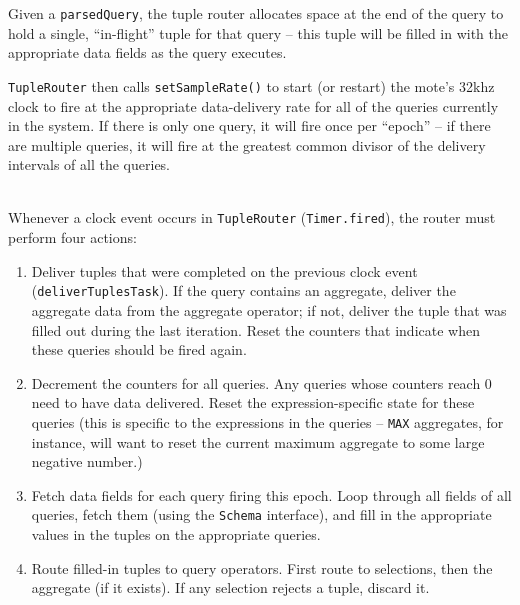 \documentclass[11pt]{article}
\begin{document}
Given a {\tt parsedQuery}, the tuple router allocates space at the end
  of the query to hold a single, ``in-flight'' tuple for that query --
  this tuple will be filled in with the appropriate data fields as the
  query executes.
  
{\tt TupleRouter} then calls {\tt setSampleRate()} to start (or restart) the
  mote's 32khz clock to fire at the appropriate data-delivery rate for
  all of the queries currently in the system.  If there is only one
  query, it will fire once per ``epoch'' -- if there are multiple queries,
  it will fire at the greatest common divisor of the delivery intervals of all the queries.

\vspace{1em}
\\
Whenever a clock event occurs in {\tt TupleRouter} ({\tt Timer.fired}), the
  router must perform four actions:
\begin{enumerate}

\item Deliver tuples that were completed on the previous clock event
  ({\tt deliverTuplesTask}).  If the query contains an aggregate,
  deliver the aggregate data from the aggregate operator;  if not,
  deliver the tuple that was filled out during the last
  iteration. Reset the counters that  indicate when these queries
  should be fired again.
  
\item Decrement the counters for all queries.  Any queries whose
  counters reach 0 need to have data delivered.  Reset the
  expression-specific state for these queries (this is specific
  to the expressions in the queries -- {\tt MAX} aggregates, for instance,
  will want to reset the current maximum aggregate to some large
  negative number.)

\item Fetch data fields for each query firing this epoch.  Loop
  through all fields of all queries, fetch them (using the {\tt Schema}
  interface), and fill in the appropriate values in the tuples
  on the appropriate queries.  
  
\item Route filled-in tuples to query operators.  First route to
  selections, then the aggregate (if it exists).  If any selection
  rejects a tuple, discard it.

\end{enumerate}
\end{document}
